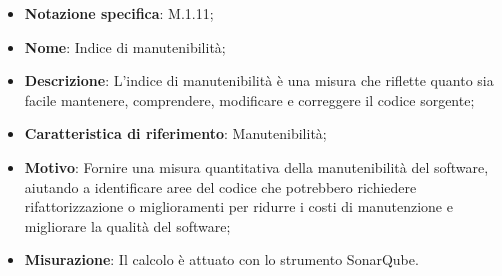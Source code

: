\begin{itemize}
    \item \textbf{Notazione specifica}: M.1.11;
    \item \textbf{Nome}: Indice di manutenibilità;
    \item \textbf{Descrizione}: L'indice di manutenibilità è una misura che riflette quanto sia facile mantenere, comprendere, modificare e correggere il codice sorgente;
    \item \textbf{Caratteristica di riferimento}: Manutenibilità;
    \item \textbf{Motivo}: Fornire una misura quantitativa della manutenibilità del software, aiutando a identificare aree del codice che potrebbero richiedere rifattorizzazione o miglioramenti per ridurre i costi di manutenzione e migliorare la qualità del software;
    \item \textbf{Misurazione}: Il calcolo è attuato con lo strumento SonarQube.
\end{itemize}

